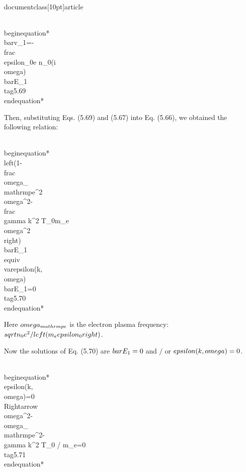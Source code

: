 \\documentclass[10pt]{article}
\begin{document}
{{{\\begin{equation*}
\\bar{v}_{1}=-\\frac{\\epsilon_{0}}{e n_{0}}(i \\omega) \\bar{E}_{1} \\tag{5.69}
\\end{equation*}


Then, substituting Eqs. (5.69) and (5.67) into Eq. (5.66), we obtained the following relation:


\\begin{equation*}
\\left(1-\\frac{\\omega_{\\mathrm{pe}}^{2}}{\\omega^{2}}-\\frac{\\gamma k^{2} T_{0}}{m_{e} \\omega^{2}}\\right) \\bar{E}_{1} \\equiv \\varepsilon(k, \\omega) \\bar{E}_{1}=0 \\tag{5.70}
\\end{equation*}


Here $\\omega_{\\mathrm{pe}}$ is the electron plasma frequency: $\\sqrt{n_{0} e^{2} /\\left(m_{e} \\epsilon_{0}\\right)}$.

Now the solutions of Eq. (5.70) are $\\bar{E}_{1}=0$ and $/$ or $\\epsilon(k, \\omega)=0$.


\\begin{equation*}
\\epsilon(k, \\omega)=0 \\Rightarrow \\omega^{2}-\\omega_{\\mathrm{pe}}^{2}-\\gamma k^{2} T_{0} / m_{e}=0 \\tag{5.71}
\\end{equation*}


}}}
\end{document}
